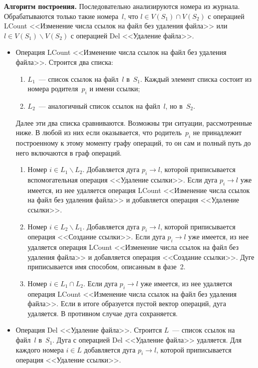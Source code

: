 \begin{multicols}{2}
      \noindent
      \textbf{Алгоритм построения.} Последовательно анализируются 
номера из журнала. Обрабатываются только такие номера~$l$, что $l\in  
V(S_1)\cap V(S_2)$ с операцией LCount <<Изменение числа ссылок на файл без 
удаления файла>> или $l\in V(S_1)\backslash V(S_2)$  с операцией Del 
<<Удаление файла>>. 
\begin{itemize}
\item Операция LCount <<Изменение числа ссылок на файл без удаления 
файла>>. Строится два \mbox{списка:} 
\begin{enumerate}[(1)]
\item $L_1$~--- список ссылок на файл~$l$ в~$S_1$. Каждый элемент 
списка состоит из номера родителя~$p_i$ и имени ссылки;
\item $L_2$~--- аналогичный список ссылок на файл~$l$, но в~$S_2$.
\end{enumerate}
Далее эти два списка сравниваются. Возможны три ситуации, 
рассмотренные ниже. В любой из них если оказывается, что 
родитель~$p_i$ не принадлежит построенному к этому моменту графу 
операций, то он сам и полный путь до него включаются в граф операций.
\begin{enumerate}[1.]
\item Номер $i \in L_1\backslash L_2$. Добавляется дуга $p_i\rightarrow l$,\linebreak 
которой приписывается вспомогательная операция <<Удаление 
ссылки>>. Если дуга $p_i\rightarrow l$ уже имеется, из нее удаляется 
операция LCount <<Изменение числа ссылок на файл без удаления 
файла>> и добавляется операция <<Удаление ссылки>>.
\item Номер $i \in L_2\backslash L_1$. Добавляется дуга $p_i\rightarrow l$, 
которой приписывается операция <<Создание ссылки>>. Если дуга 
$p_i\rightarrow l$ уже имеется, из нее удаляется операция LCount 
<<Изменение числа ссылок на файл без удаления файла>> и 
добавляется операция <<Создание ссылки>>. Дуге приписывается имя 
способом, описанным в фазе~2. 
\item Номер $i\in L_1\cap L_2$. Если дуга $p_i\rightarrow l$ уже имеется, из 
нее удаляется операция LCount <<Изменение числа ссылок на файл 
без удаления файла>>. Если в итоге образуется пустой вектор 
операций, дуга удаляется. В противном случае дуга сохраняется.
\end{enumerate}
\item Операция Del <<Удаление файла>>. Строится $L$~--- список ссылок 
на файл~$l$ в~$S_1$. Дуга с операцией Del <<Удаление файла>> удаляется. 
Для каждого номера $i\in L$ добавляется дуга $p_i \rightarrow l$, которой 
приписывается операция <<Удаление ссылки>>.
\end{itemize}


\end{multicols}
